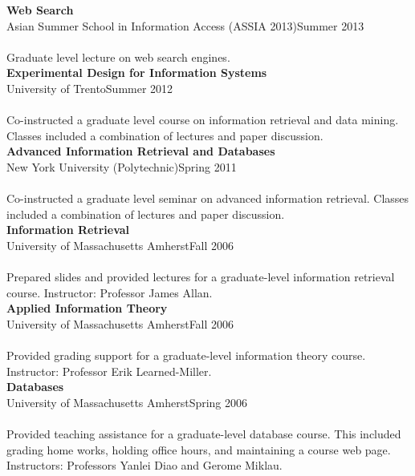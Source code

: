 \documentclass{article}
\begin{document}
\noindent\textbf{Web Search} \\
Asian Summer School in Information Access (ASSIA 2013)\hfill Summer 2013\\\\
Graduate level lecture on web search engines.  \\


\noindent\textbf{Experimental Design for Information Systems} \\
University of Trento\hfill Summer 2012\\\\
Co-instructed a graduate level course on information retrieval and data mining.  Classes included a combination of lectures and paper discussion. \\

\noindent\textbf{Advanced Information Retrieval and Databases} \\
New York University (Polytechnic)\hfill Spring 2011\\\\
Co-instructed a graduate level seminar on advanced information retrieval.  Classes included a combination of lectures and paper discussion. \\

\noindent\textbf{Information Retrieval} \\
University of Massachusetts Amherst\hfill Fall 2006\\\\
Prepared slides and provided lectures for a graduate-level information retrieval course. Instructor: Professor James Allan.\\

\noindent\textbf{Applied Information Theory} \\
University of Massachusetts Amherst\hfill Fall 2006\\\\
Provided grading support for a graduate-level information theory course. Instructor: Professor Erik Learned-Miller.\\

\noindent\textbf{Databases} \\
University of Massachusetts Amherst\hfill Spring 2006\\\\
Provided teaching assistance for a graduate-level database course. This included grading home works, holding office hours, and maintaining a course web page. Instructors: Professors Yanlei Diao and Gerome Miklau.
\end{document}
